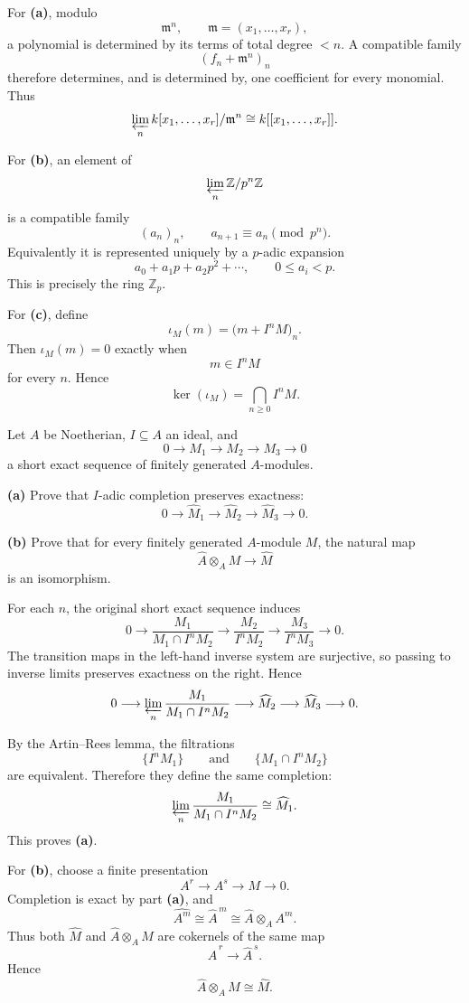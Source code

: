 \begin{solution}
For \textbf{(a)}, modulo
\[
\mathfrak m^n,\qquad \mathfrak m=(x_1,\dots,x_r),
\]
a polynomial is determined by its terms of total degree \(<n\). A compatible
family
\[
(f_n+\mathfrak m^n)_n
\]
therefore determines, and is determined by, one coefficient for every
monomial. Thus
\[
\varprojlim_n k[x_1,\dots,x_r]/\mathfrak m^n
\cong
k[[x_1,\dots,x_r]].
\]

For \textbf{(b)}, an element of
\[
\varprojlim_n\mathbb Z/p^n\mathbb Z
\]
is a compatible family
\[
(a_n)_n,\qquad
a_{n+1}\equiv a_n\pmod{p^n}.
\]
Equivalently it is represented uniquely by a \(p\)-adic expansion
\[
a_0+a_1p+a_2p^2+\cdots,
\qquad
0\le a_i<p.
\]
This is precisely the ring \(\mathbb Z_p\).

For \textbf{(c)}, define
\[
\iota_M(m)=\bigl(m+I^nM\bigr)_n.
\]
Then \(\iota_M(m)=0\) exactly when
\[
m\in I^nM
\]
for every \(n\). Hence
\[
\ker(\iota_M)=\bigcap_{n\ge0}I^nM.
\]
\end{solution}


\begin{problem}[CP-V-0031]
\label{prob:cp-v-0031}
Let \(A\) be Noetherian, \(I\subseteq A\) an ideal, and
\[
0\longrightarrow M_1\longrightarrow M_2\longrightarrow M_3\longrightarrow0
\]
a short exact sequence of finitely generated \(A\)-modules.

\textbf{(a)} Prove that \(I\)-adic completion preserves exactness:
\[
0\longrightarrow\widehat M_1
\longrightarrow\widehat M_2
\longrightarrow\widehat M_3
\longrightarrow0.
\]

\textbf{(b)} Prove that for every finitely generated \(A\)-module \(M\),
the natural map
\[
\widehat A\otimes_A M\longrightarrow\widehat M
\]
is an isomorphism.
\end{problem}

\begin{solution}
For each \(n\), the original short exact sequence induces
\[
0\longrightarrow
\frac{M_1}{M_1\cap I^nM_2}
\longrightarrow
\frac{M_2}{I^nM_2}
\longrightarrow
\frac{M_3}{I^nM_3}
\longrightarrow0.
\]
The transition maps in the left-hand inverse system are surjective, so
passing to inverse limits preserves exactness on the right. Hence
\[
0\longrightarrow
\varprojlim_n\frac{M_1}{M_1\cap I^nM_2}
\longrightarrow
\widehat M_2
\longrightarrow
\widehat M_3
\longrightarrow0.
\]

By the Artin--Rees lemma, the filtrations
\[
\{I^nM_1\}
\qquad\text{and}\qquad
\{M_1\cap I^nM_2\}
\]
are equivalent. Therefore they define the same completion:
\[
\varprojlim_n\frac{M_1}{M_1\cap I^nM_2}
\cong
\widehat M_1.
\]
This proves \textbf{(a)}.

For \textbf{(b)}, choose a finite presentation
\[
A^r\longrightarrow A^s\longrightarrow M\longrightarrow0.
\]
Completion is exact by part \textbf{(a)}, and
\[
\widehat{A^m}\cong\widehat A^{\,m}
\cong
\widehat A\otimes_A A^m.
\]
Thus both \(\widehat M\) and \(\widehat A\otimes_A M\) are cokernels of the
same map
\[
\widehat A^{\,r}\longrightarrow\widehat A^{\,s}.
\]
Hence
\[
\widehat A\otimes_A M\cong\widehat M.
\]
\end{solution}


